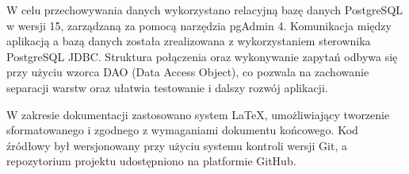 W celu przechowywania danych wykorzystano relacyjną bazę danych PostgreSQL w wersji 15, zarządzaną za pomocą narzędzia pgAdmin 4. Komunikacja między aplikacją a bazą danych została zrealizowana z wykorzystaniem sterownika PostgreSQL JDBC. Struktura połączenia oraz wykonywanie zapytań odbywa się przy użyciu wzorca DAO (Data Access Object), co pozwala na zachowanie separacji warstw oraz ułatwia testowanie i dalszy rozwój aplikacji.

W zakresie dokumentacji zastosowano system \LaTeX{}, umożliwiający tworzenie sformatowanego i zgodnego z wymaganiami dokumentu końcowego. Kod źródłowy był wersjonowany przy użyciu systemu kontroli wersji Git, a repozytorium projektu udostępniono na platformie GitHub.



